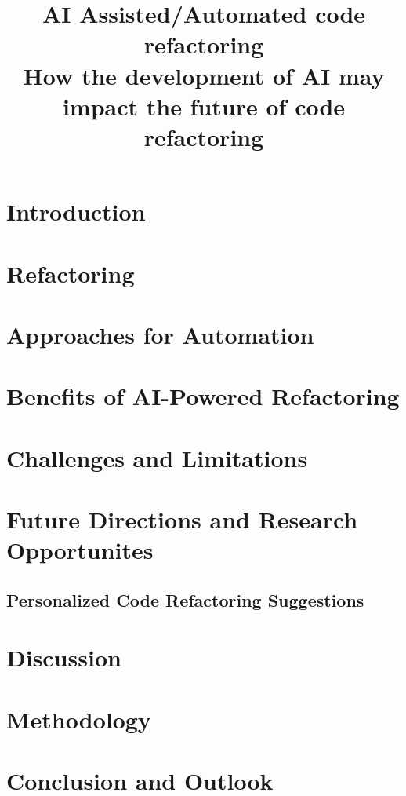 \documentclass[conference]{IEEEtran}
\begin{document}
\title{AI Assisted/Automated code refactoring\\
{\footnotesize How the development of AI may impact the future of code refactoring}
}

\author{
    \and
}

\maketitle



\section{Introduction}\label{introduction}


\section{Refactoring}


\section{Approaches for Automation}\label{automation}

\section{Benefits of AI-Powered Refactoring}\label{benefits}


\section{Challenges and Limitations}


\section{Future Directions and Research Opportunites}


\subsection{Personalized Code Refactoring Suggestions}
\section{Discussion}


\section{Methodology}

\section{Conclusion and Outlook}

\end{document}
